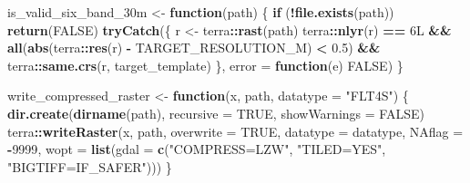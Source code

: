 \documentclass[
]{article}
\newenvironment{Shaded}{\begin{snugshade}}{\end{snugshade}}
\newcommand{\AttributeTok}[1]{\textcolor[rgb]{0.13,0.29,0.53}{#1}}
\newcommand{\ConstantTok}[1]{\textcolor[rgb]{0.56,0.35,0.01}{#1}}
\newcommand{\ControlFlowTok}[1]{\textcolor[rgb]{0.13,0.29,0.53}{\textbf{#1}}}
\newcommand{\DataTypeTok}[1]{\textcolor[rgb]{0.13,0.29,0.53}{#1}}
\newcommand{\DecValTok}[1]{\textcolor[rgb]{0.00,0.00,0.81}{#1}}
\newcommand{\FloatTok}[1]{\textcolor[rgb]{0.00,0.00,0.81}{#1}}
\newcommand{\FunctionTok}[1]{\textcolor[rgb]{0.13,0.29,0.53}{\textbf{#1}}}
\newcommand{\NormalTok}[1]{#1}
\newcommand{\OtherTok}[1]{\textcolor[rgb]{0.56,0.35,0.01}{#1}}
\newcommand{\SpecialCharTok}[1]{\textcolor[rgb]{0.81,0.36,0.00}{\textbf{#1}}}
\newcommand{\StringTok}[1]{\textcolor[rgb]{0.31,0.60,0.02}{#1}}
\begin{document}
\begin{Shaded}
\begin{Highlighting}[]
\NormalTok{is\_valid\_six\_band\_30m }\OtherTok{\textless{}{-}} \ControlFlowTok{function}\NormalTok{(path) \{}
  \ControlFlowTok{if}\NormalTok{ (}\SpecialCharTok{!}\FunctionTok{file.exists}\NormalTok{(path)) }\FunctionTok{return}\NormalTok{(}\ConstantTok{FALSE}\NormalTok{)}
  \FunctionTok{tryCatch}\NormalTok{(\{}
\NormalTok{    r }\OtherTok{\textless{}{-}}\NormalTok{ terra}\SpecialCharTok{::}\FunctionTok{rast}\NormalTok{(path)}
\NormalTok{    terra}\SpecialCharTok{::}\FunctionTok{nlyr}\NormalTok{(r) }\SpecialCharTok{==} \DecValTok{6}\DataTypeTok{L} \SpecialCharTok{\&\&} \FunctionTok{all}\NormalTok{(}\FunctionTok{abs}\NormalTok{(terra}\SpecialCharTok{::}\FunctionTok{res}\NormalTok{(r) }\SpecialCharTok{{-}}\NormalTok{ TARGET\_RESOLUTION\_M) }\SpecialCharTok{\textless{}} \FloatTok{0.5}\NormalTok{) }\SpecialCharTok{\&\&}
\NormalTok{      terra}\SpecialCharTok{::}\FunctionTok{same.crs}\NormalTok{(r, target\_template)}
\NormalTok{  \}, }\AttributeTok{error =} \ControlFlowTok{function}\NormalTok{(e) }\ConstantTok{FALSE}\NormalTok{)}
\NormalTok{\}}

\NormalTok{write\_compressed\_raster }\OtherTok{\textless{}{-}} \ControlFlowTok{function}\NormalTok{(x, path, }\AttributeTok{datatype =} \StringTok{"FLT4S"}\NormalTok{) \{}
  \FunctionTok{dir.create}\NormalTok{(}\FunctionTok{dirname}\NormalTok{(path), }\AttributeTok{recursive =} \ConstantTok{TRUE}\NormalTok{, }\AttributeTok{showWarnings =} \ConstantTok{FALSE}\NormalTok{)}
\NormalTok{  terra}\SpecialCharTok{::}\FunctionTok{writeRaster}\NormalTok{(x, path, }\AttributeTok{overwrite =} \ConstantTok{TRUE}\NormalTok{, }\AttributeTok{datatype =}\NormalTok{ datatype,}
                     \AttributeTok{NAflag =} \SpecialCharTok{{-}}\DecValTok{9999}\NormalTok{,}
                     \AttributeTok{wopt =} \FunctionTok{list}\NormalTok{(}\AttributeTok{gdal =} \FunctionTok{c}\NormalTok{(}\StringTok{"COMPRESS=LZW"}\NormalTok{, }\StringTok{"TILED=YES"}\NormalTok{, }\StringTok{"BIGTIFF=IF\_SAFER"}\NormalTok{)))}
\NormalTok{\}}



\end{Highlighting}
\end{Shaded}
\end{document}
